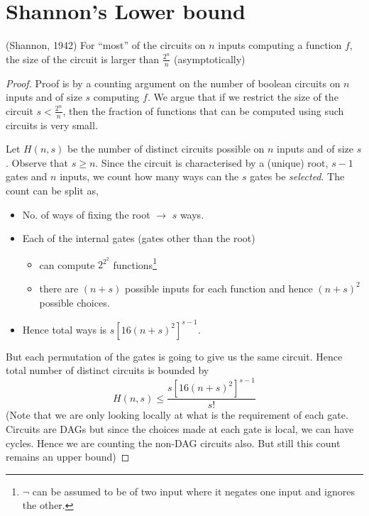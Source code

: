 \section{Shannon's Lower bound}
\begin{theorem}(Shannon, 1942) For  ``most'' of the circuits on $n$ inputs
computing a function $f$, the size of the circuit is larger than
$\frac{2^n}{n}$ (asymptotically)
\end{theorem}
\begin{proof}
Proof is by a counting argument on the number of boolean circuits on $n$
inputs and of size $s$ computing $f$. We argue that if we restrict the size of
the circuit $s < \frac{2^n}{n}$, then the fraction of functions that can be
computed using such circuits is very small.

Let $H(n,s)$ be the number of distinct circuits possible on $n$ inputs and of
size $s$. Observe that $s \ge n$. Since the circuit is characterised by a
(unique) root, $s-1$ gates and $n$ inputs, we count how many ways can the $s$
gates be \emph{selected}. The count can be split as,
\begin{itemize}
\item No. of ways of fixing the root $\to$ $s$ ways.
\item Each of the internal gates (gates other than the root)
   \begin{itemize}
   \item can compute $2^{2^2}$ functions\footnote{$\neg$ can be assumed to be
   of two input where it negates one input and ignores the other.}
   \item there are $(n+s)$ possible inputs for each function and hence $(n+s)^2$
   possible choices.
   \end{itemize}
\item Hence total ways is $s[16(n+s)^2]^{s-1}$.
\end{itemize}

But each permutation of the gates is going to give us the same circuit. Hence
total number of distinct circuits is bounded by
\[ H(n,s) \le  \frac{s[16(n+s)^2]^{s-1}}{s!} \]
(Note that we are only looking locally at what is the requirement of each gate.
Circuits are DAGs but since the choices made at each gate is local, we can
have cycles. Hence we are counting the non-DAG circuits also. But still this
count remains an upper bound)


\end{proof}
